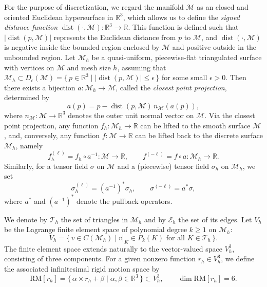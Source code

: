\documentclass[11pt,a4paper,oneside,reqno]{amsart}
\theoremstyle{definition}
\theoremstyle{plain}
\numberwithin{theorem}{section}
\numberwithin{proposition}{section}
\numberwithin{lemma}{section}
\numberwithin{equation}{section}
\newcommand{\Man}{\mathcal{M}}
\newcommand{\RM}{\mathrm{RM}}
\begin{document}
For the purpose of discretization, we regard the manifold $\Man$ as an closed and oriented Euclidean hypersurface in $\mathbb{R}^3$, which allows us to define the \emph{signed distance function} $\operatorname{dist}(\cdot,\Man): \mathbb{R}^3 \rightarrow \mathbb{R}$.  This function is defined such that $|\operatorname{dist}(p,\Man)|$ represents the Euclidean distance from $p$ to $\Man$, and $\operatorname{dist}(\cdot,\Man)$ is negative inside the bounded region enclosed by $\Man$ and positive outside in the unbounded region.
Let \(\Man_h\) be a quasi-uniform, piecewise-flat triangulated surface with vertices on \(\Man\) and mesh size \(h\), assuming that
\(\Man_h \subset D_{\epsilon}(\Man)=\{\,p\in\mathbb R^{3}\mid |\operatorname{dist}(p,\Man)|\le \epsilon\,\}\) for some small \(\epsilon>0\).
Then there exists a bijection \(a:\Man_h\to\Man\), called the \emph{closest point projection}, determined by
\[
a(p) = p - \operatorname{dist}(p,\Man)\, n_{\Man}(a(p)),
\]
where \(n_{\Man}:\Man\to\mathbb R^{3}\) denotes the outer unit normal vector on \(\Man\).
 Via the closest point projection, any function \(f_h: \Man_h \to \mathbb{R}\) can be lifted to the smooth surface \(\Man\), and, conversely, any function \(f: \Man \to \mathbb{R}\) can be lifted back to the discrete surface \(\Man_h\), namely
\[
f_h^{(\ell)} = f_h \circ a^{-1}: \Man \to \mathbb{R},
\qquad
f^{(-\ell)} = f \circ a: \Man_h \to \mathbb{R}.
\]
Similarly, for a tensor field \(\sigma\) on \(\Man\) and a (piecewise) tensor field \(\sigma_h\) on \(\Man_h\), we set
\[
\sigma_h^{(\ell)} = (a^{-1})^* \sigma_h,
\qquad
\sigma^{(-\ell)} = a^* \sigma,
\]
where \(a^*\) and \((a^{-1})^*\) denote the pullback operators.

We denote by $\mathcal{T}_h$ the set of triangles in $\Man_h$ and by $\mathcal{E}_h$ the set of its edges.
Let \(V_h\) be the Lagrange finite element space of polynomial degree \(k\ge 1\) on \(\Man_h\):
\[
V_h = \{\, v \in C(\Man_h) \mid v|_K \in P_k(K) \text{ for all } K \in \mathcal{T}_h  \,\}.
\]
The finite element space extends naturally to the vector-valued space \(V_h^3\), consisting of three components. For a given nonzero function \(r_h\in V_h^3\), we define the associated infinitesimal rigid motion space by
\[
\RM[r_h] = \{\, \alpha \times r_h + \beta \mid \alpha, \beta \in \mathbb{R}^3 \,\} \subset V_h^3,
\qquad \dim \RM[r_h] = 6.
\]
\end{document}
